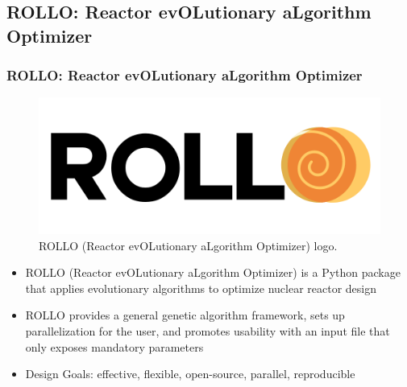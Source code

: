 \subsection{ROLLO: Reactor evOLutionary aLgorithm Optimizer}
\begin{frame}
    \frametitle{ROLLO: Reactor evOLutionary aLgorithm Optimizer}
    \begin{figure}
        \includegraphics[width=0.7\linewidth]{figures/rollo-logo.png} 
        \caption{ROLLO (Reactor evOLutionary aLgorithm Optimizer) logo.}
    \end{figure}
    \begin{itemize}
        \item ROLLO (Reactor evOLutionary aLgorithm Optimizer) is a Python package 
        that applies evolutionary algorithms to optimize nuclear reactor design
        \item ROLLO provides a general genetic algorithm framework, sets up 
        parallelization for the user, and promotes usability with an input file that
        only exposes mandatory parameters
        \item Design Goals: effective, flexible, open-source, parallel,
        reproducible
    \end{itemize}
\end{frame}

